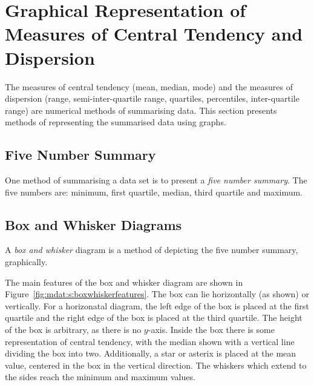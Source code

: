 \section{Graphical Representation of Measures of Central Tendency and Dispersion}

The measures of central tendency (mean, median, mode) and the measures of dispersion (range, semi-inter-quartile range, quartiles, percentiles, inter-quartile range) are numerical methods of summarising data. This section presents methods of representing the summarised data using graphs.

\subsection{Five Number Summary}
One method of summarising a data set is to present a \textit{five number summary}. The five numbers are: minimum, first quartile, median, third quartile and maximum.

\subsection{Box and Whisker Diagrams}
A \textit{box and whisker} diagram is a method of depicting the five number summary, graphically.

The main features of the box and whisker diagram are shown in Figure~\ref{fig:mdat:s:boxwhiskerfeatures}. The box can lie horizontally (as shown) or vertically. For a horizonatal diagram, the left edge of the box is placed at the first quartile and the right edge of the box is placed at the third quartile. The height of the box is arbitrary, as there is no $y$-axis. Inside the box there is some representation of central tendency, with the median shown with a vertical line dividing the box into two. Additionally, a star or asterix is placed at the mean value, centered in the box in the vertical direction. The whiskers which extend to the sides reach the minimum and maximum values.

